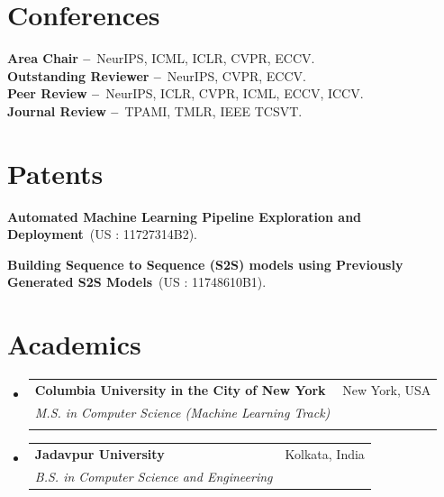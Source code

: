 \documentclass[letterpaper,11pt]{article}
\makeatletter
\newcommand{\resumeSubheading}[4]{
  \vspace{-2pt}\item
    \begin{tabular*}{0.97\textwidth}[t]{l@{\extracolsep{\fill}}r}
      \textbf{#1} & #2 \\
      \textit{\small#3} & \textit{\small #4} \\
    \end{tabular*}\vspace{-7pt}
}
\newcommand{\resumeEducationHeading}[6]{
  \vspace{-2pt}\item
    \begin{tabular*}{0.97\textwidth}[t]{l@{\extracolsep{\fill}}r}
      \textbf{#1} & #2 \\
      \textit{\small#3} & \textit{\small #4} \\
      \textit{\small#5} & \textit{\small #6} \\
    \end{tabular*}\vspace{-5pt}
}
\newcommand{\resumeSubHeadingListStart}{\begin{itemize}[leftmargin=0.15in, label={}]}
\newcommand{\resumeSubHeadingListEnd}{\end{itemize}}
\makeatother
\begin{document}
\section{Conferences}
  \vspace{2pt}
  \resumeSubHeadingListStart
    \small{\item{
        \textbf{Area Chair --}{\ NeurIPS, ICML, ICLR, CVPR, ECCV.} \\ \vspace{3pt}
        \textbf{Outstanding Reviewer --}{\ NeurIPS, CVPR, ECCV.} \\ \vspace{3pt}
        \textbf{Peer Review --}{\ NeurIPS, ICLR, CVPR, ICML, ECCV, ICCV.} \\ \vspace{3pt}
        \textbf{Journal Review --}{\ TPAMI, TMLR, IEEE TCSVT.} \\ \vspace{3pt}
    }}
  \resumeSubHeadingListEnd

\section{Patents}
  \vspace{2pt}
  \resumeSubHeadingListStart
    \small{\item{
        \textbf{Automated Machine Learning Pipeline Exploration and Deployment}{\ (US : 11727314B2).} \\ \vspace{3pt}
    }}
    \small{\item{
        \textbf{Building Sequence to Sequence (S2S) models using Previously Generated S2S Models}{\ (US : 11748610B1).} \\ \vspace{3pt}
    }}
  \resumeSubHeadingListEnd

\section{Academics}
  \vspace{3pt}
  \resumeSubHeadingListStart
    \resumeEducationHeading
      {Columbia University in the City of New York
      }{New York, USA}
      {M.S. in Computer Science (Machine Learning Track)}{}
      {}{}

    \resumeSubheading
      {Jadavpur University
      }{Kolkata, India}
      {B.S. in Computer Science and Engineering}{}
    
  \resumeSubHeadingListEnd
\end{document}
